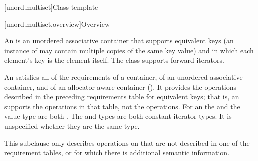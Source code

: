 [unord.multiset]{Class template }%

[unord.multiset.overview]{Overview}

\pnum
{}%
%
An  is an unordered associative container
that supports equivalent keys (an instance of  may contain
multiple copies of the same key value) and in which each element's key
is the element itself.
The  class
supports forward iterators.

\pnum
An  satisfies all of the requirements of a container, of an
unordered associative container, and of an allocator-aware container
(). It provides the operations described in the
preceding requirements table for equivalent keys; that is, an 
supports the  operations in that table, not the  operations.
For an  the  and the value type are
both . The  and  types are both
constant iterator types. It is unspecified whether they are the same type.

\pnum
This subclause only describes operations on  that
are not described in one of the requirement tables, or for which there
is additional semantic information.

